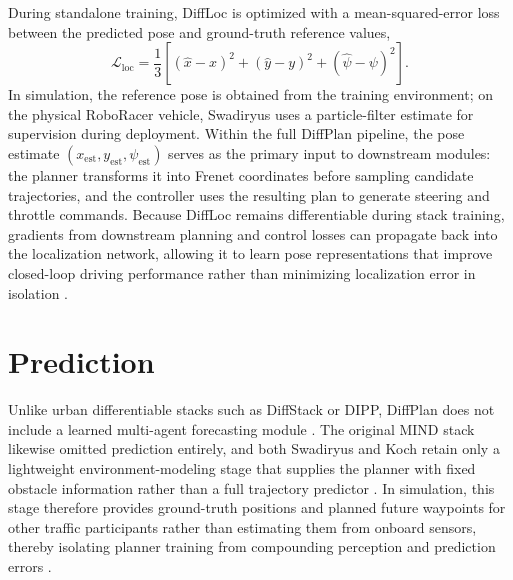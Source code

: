 During standalone training, DiffLoc is optimized with a mean-squared-error loss between the predicted pose and ground-truth reference values,
\begin{equation}
    \mathcal{L}_{\text{loc}} = \frac{1}{3}\left[(\hat{x} - x)^2 + (\hat{y} - y)^2 + (\hat{\psi} - \psi)^2\right].
\end{equation}
In simulation, the reference pose is obtained from the training environment; on the physical RoboRacer vehicle, Swadiryus \cite{swadiryus_DifferentiableMotionPlanning_2025} uses a particle-filter estimate for supervision during deployment.
Within the full DiffPlan pipeline, the pose estimate $(x_{\text{est}}, y_{\text{est}}, \psi_{\text{est}})$ serves as the primary input to downstream modules: the planner transforms it into Frenet coordinates before sampling candidate trajectories, and the controller uses the resulting plan to generate steering and throttle commands.
Because DiffLoc remains differentiable during stack training, gradients from downstream planning and control losses can propagate back into the localization network, allowing it to learn pose representations that improve closed-loop driving performance rather than minimizing localization error in isolation \cite{jahncke_MINDStackModularInterpretable_2025, swadiryus_DifferentiableMotionPlanning_2025}.

\section{Prediction}
\label{section:DiffPlanPrediction}

Unlike urban differentiable stacks such as DiffStack or DIPP, DiffPlan does not include a learned multi-agent forecasting module \cite{koch_DifferentiableInterpretablePath_2025, swadiryus_DifferentiableMotionPlanning_2025}.
The original MIND stack likewise omitted prediction entirely, and both Swadiryus and Koch retain only a lightweight environment-modeling stage that supplies the planner with fixed obstacle information rather than a full trajectory predictor \cite{jahncke_MINDStackModularInterpretable_2025, swadiryus_DifferentiableMotionPlanning_2025, koch_DifferentiableInterpretablePath_2025}.
In simulation, this stage therefore provides ground-truth positions and planned future waypoints for other traffic participants rather than estimating them from onboard sensors, thereby isolating planner training from compounding perception and prediction errors \cite{koch_DifferentiableInterpretablePath_2025}.

